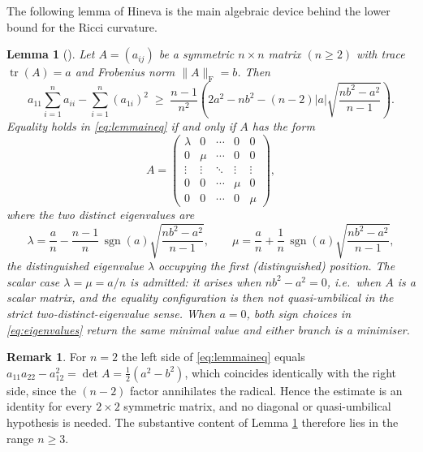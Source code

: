 \documentclass[11pt]{article}
\newtheorem{lemma}[theorem]{Lemma}
\theoremstyle{definition}
\newtheorem{remark}[theorem]{Remark}
\newcommand{\tr}{\operatorname{tr}}
\newcommand{\sgn}{\operatorname{sgn}}
\newcommand{\Frob}{\mathrm{F}}
\begin{document}
The following lemma of Hineva \cite{Hineva3} is the main algebraic device behind the lower bound for the Ricci curvature.

\begin{lemma}[\cite{Hineva3}]\label{lem:hineva}
Let $A=(a_{ij})$ be a symmetric $n\times n$ matrix $(n\ge2)$ with trace $\tr(A)=a$ and Frobenius norm $\|A\|_{\Frob}=b$. Then
\begin{equation}\label{eq:lemmaineq}
a_{11}\sum_{i=1}^{n}a_{ii}-\sum_{i=1}^{n}(a_{1i})^2\;\ge\;\frac{n-1}{n^2}\left(2a^2-nb^2-(n-2)|a|\sqrt{\frac{nb^2-a^2}{n-1}}\right).
\end{equation}
Equality holds in \eqref{eq:lemmaineq} if and only if $A$ has the form
\begin{equation}\label{eq:matrixform}
A=\begin{pmatrix}
\lambda&0&\cdots&0&0\\
0&\mu&\cdots&0&0\\
\vdots&\vdots&\ddots&\vdots&\vdots\\
0&0&\cdots&\mu&0\\
0&0&\cdots&0&\mu
\end{pmatrix},
\end{equation}
where the two distinct eigenvalues are
\begin{equation}\label{eq:eigenvalues}
\lambda=\frac{a}{n}-\frac{n-1}{n}\,\sgn(a)\sqrt{\frac{nb^2-a^2}{n-1}},\qquad
\mu=\frac{a}{n}+\frac{1}{n}\,\sgn(a)\sqrt{\frac{nb^2-a^2}{n-1}},
\end{equation}
the distinguished eigenvalue $\lambda$ occupying the first (distinguished) position. The scalar case $\lambda=\mu=a/n$ is admitted: it arises when $nb^2-a^2=0$, i.e.\ when $A$ is a scalar matrix, and the equality configuration is then not quasi-umbilical in the strict two-distinct-eigenvalue sense. When $a=0$, both sign choices in \eqref{eq:eigenvalues} return the same minimal value and either branch is a minimiser.
\end{lemma}

\begin{remark}\label{rem:n2lemma}
For $n=2$ the left side of \eqref{eq:lemmaineq} equals $a_{11}a_{22}-a_{12}^2=\det A=\tfrac12(a^2-b^2)$, which coincides identically with the right side, since the $(n-2)$ factor annihilates the radical. Hence the estimate is an identity for every $2\times2$ symmetric matrix, and no diagonal or quasi-umbilical hypothesis is needed. The substantive content of Lemma \ref{lem:hineva} therefore lies in the range $n\ge3$.
\end{remark}
\end{document}
